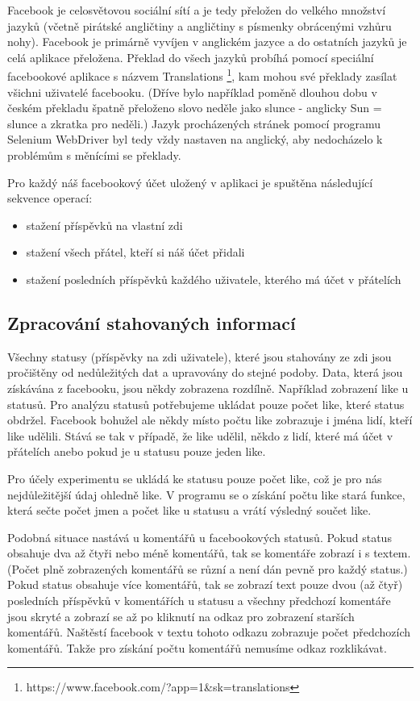\documentclass[thesis=M,czech]{FITthesis}[2013/05/10]
\begin{document}
Facebook je celosvětovou sociální sítí a je tedy přeložen do velkého množství jazyků (včetně pirátské angličtiny a angličtiny s písmenky obrácenými vzhůru nohy). Facebook je primárně vyvíjen v anglickém jazyce a do ostatních jazyků je celá aplikace přeložena. Překlad do všech jazyků probíhá pomocí speciální facebookové aplikace s názvem Translations \footnote{https://www.facebook.com/?app=1\&sk=translations}, kam mohou své překlady zasílat všichni uživatelé facebooku. (Dříve bylo například poměně dlouhou dobu v českém překladu špatně přeloženo slovo neděle jako slunce - anglicky Sun = slunce a zkratka pro neděli.) Jazyk procházených stránek pomocí programu Selenium WebDriver byl tedy vždy nastaven na anglický, aby nedocházelo k problémům s měnícími se překlady. 

Pro každý náš facebookový účet uložený v aplikaci je spuštěna následující sekvence operací:

\begin{itemize}
  \item stažení příspěvků na vlastní zdi
  \item stažení všech přátel, kteří si náš účet přidali
  \item stažení posledních příspěvků každého uživatele, kterého má účet v přátelích
\end{itemize}

\subsection{Zpracování stahovaných informací}

Všechny statusy (příspěvky na zdi uživatele), které jsou stahovány ze zdi jsou pročištěny od nedůležitých dat a upravovány do stejné podoby. Data, která jsou získávána z facebooku, jsou někdy zobrazena rozdílně. Například zobrazení like u statusů. Pro analýzu statusů potřebujeme ukládat pouze počet like, které status obdržel. Facebook bohužel ale někdy místo počtu like zobrazuje i jména lidí, kteří like udělili. Stává se tak v případě, že like udělil, někdo z lidí, které má účet v přátelích anebo pokud je u statusu pouze jeden like.

Pro účely experimentu se ukládá ke statusu pouze počet like, což je pro nás nejdůležitější údaj ohledně like. V programu se o získání počtu like stará funkce, která sečte počet jmen a počet like u statusu a vrátí výsledný součet like. 

Podobná situace nastává u komentářů u facebookových statusů. Pokud status obsahuje dva až čtyři nebo méně komentářů, tak se komentáře zobrazí i s textem. (Počet plně zobrazených komentářů se různí a není dán pevně pro každý status.) Pokud status obsahuje  více komentářů, tak se zobrazí text pouze dvou (až čtyř) posledních příspěvků v komentářích u statusu a všechny předchozí komentáře jsou skryté a zobrazí se až po kliknutí na odkaz pro zobrazení starších komentářů. Naštěstí facebook v textu tohoto odkazu zobrazuje počet předchozích komentářů. Takže pro získání počtu komentářů nemusíme odkaz rozklikávat. 
\end{document}
